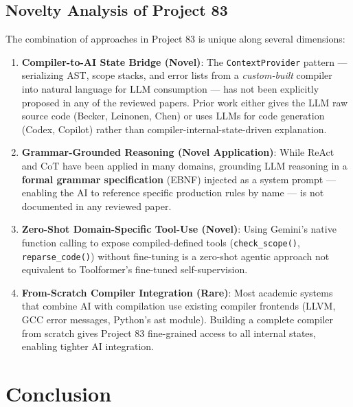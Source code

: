 \documentclass[a4paper,11pt]{article}
\begin{document}
\subsection{Novelty Analysis of Project 83}

The combination of approaches in Project 83 is unique along several dimensions:

\begin{enumerate}
    \item \textbf{Compiler-to-AI State Bridge (Novel)}: The \texttt{ContextProvider} pattern --- serializing AST, scope stacks, and error lists from a \textit{custom-built} compiler into natural language for LLM consumption --- has not been explicitly proposed in any of the reviewed papers. Prior work either gives the LLM raw source code (Becker, Leinonen, Chen) or uses LLMs for code generation (Codex, Copilot) rather than compiler-internal-state-driven explanation.

    \item \textbf{Grammar-Grounded Reasoning (Novel Application)}: While ReAct and CoT have been applied in many domains, grounding LLM reasoning in a \textbf{formal grammar specification} (EBNF) injected as a system prompt --- enabling the AI to reference specific production rules by name --- is not documented in any reviewed paper.

    \item \textbf{Zero-Shot Domain-Specific Tool-Use (Novel)}: Using Gemini's native function calling to expose compiled-defined tools (\texttt{check\_scope()}, \texttt{reparse\_code()}) without fine-tuning is a zero-shot agentic approach not equivalent to Toolformer's fine-tuned self-supervision.

    \item \textbf{From-Scratch Compiler Integration (Rare)}: Most academic systems that combine AI with compilation use existing compiler frontends (LLVM, GCC error messages, Python's ast module). Building a complete compiler from scratch gives Project 83 fine-grained access to all internal states, enabling tighter AI integration.
\end{enumerate}

\newpage

\section{Conclusion}
\end{document}
